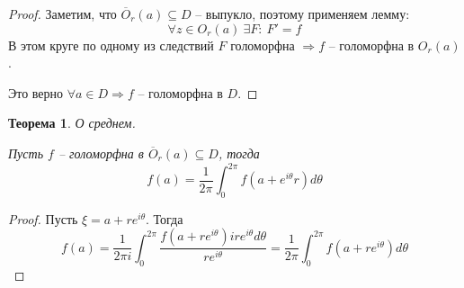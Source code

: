 \documentclass[a4paper,12pt]{article}
\theoremstyle{plain}
\newtheorem{theorem}{Теорема}[section]
\theoremstyle{definition}
\theoremstyle{remark}
\begin{document}
\begin{proof}
  Заметим, что $\overline{O}_r(a) \subseteq D$ -- выпукло, поэтому применяем лемму:
  \[
    \forall z \in O_r(a) \: \exists F :\: F' = f
  \]
  В этом круге по одному из следствий $F$ голоморфна $\Rightarrow f$ -- голоморфна в $O_r(a)$.

  Это верно $\forall a \in D \Rightarrow f$ -- голоморфна в $D$.
\end{proof}

\begin{theorem}
  О среднем.

  Пусть $f$ -- голоморфна в $\overline{O}_r(a) \subseteq D$, тогда
  \[
    f(a) = \frac{1}{2\pi}\int_0^{2\pi}f(a + e^{i\theta}r)d\theta
  \]
\end{theorem}

\begin{proof}
  Пусть $\xi = a + re^{i\theta}$. Тогда
  \[
    f(a) = \frac{1}{2\pi i}\int_0^{2\pi}\frac{f(a + re^{i\theta})ire^{i\theta}d\theta}{re^{i\theta}} = \frac{1}{2\pi}\int_0^{2\pi}f(a + re^{i\theta})d\theta
  \]
\end{proof}
\end{document}
